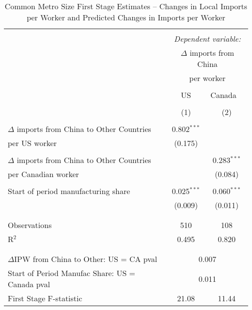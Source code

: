 

\begin{table}[!htbp] \centering 
  \caption{Common Metro Size First Stage Estimates -- Changes in Local Imports per Worker and Predicted Changes in Imports per Worker} 
  \label{tab:china_first_common} 
\begin{threeparttable}
\begin{tabular}{@{\extracolsep{5pt}}lcc} 
\\[-1.8ex]\hline 
\hline \\[-1.8ex] 
 & \multicolumn{2}{c}{\textit{Dependent variable:}} \\ 
& \multicolumn{2}{c}{$\Delta$ imports from China } \\ 
& \multicolumn{2}{c}{per worker} \\
\cline{2-3} 
\\[-1.8ex] &  US & Canada \ \\ 
\\[-1.8ex] & (1) & (2)\\ 
\hline \\[-1.8ex] 
 $\Delta$ imports from China to Other Countries & 0.802$^{***}$ &  \\ 
per US worker  & (0.175) &  \\ 
  & & \\ 
 $\Delta$ imports from China to Other Countries  &  & 0.283$^{***}$ \\ 
per Canadian worker  &  & (0.084) \\ 
  & & \\ 
 Start of period manufacturing share & 0.025$^{***}$ & 0.060$^{***}$ \\ 
  & (0.009) & (0.011) \\ 
  & & \\ 
\hline \\[-1.8ex] 
Observations & 510 & 108 \\ 
R$^{2}$ & 0.495 & 0.820 \\ 
\\[-1.8ex]  \hline \\[-1.8ex]
$\Delta$IPW from China to Other: US = CA pval & \multicolumn{2}{c}{0.007} \\
Start of Period Manufac Share: US = Canada pval & \multicolumn{2}{c}{0.011} \\
First Stage F-statistic & 21.08 & 11.44 \\

\end{tabular}
\end{threeparttable}
\end{table}
